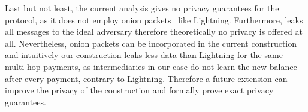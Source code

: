   Last but not least, the current analysis gives no privacy guarantees for the
  protocol, as it does not employ onion packets~\cite{sphinx} like Lightning.
  Furthermore, \fchan leaks all messages to the ideal adversary therefore
  theoretically no privacy is offered at all. Nevertheless, onion packets can be
  incorporated in the current construction and intuitively our construction
  leaks less data than Lightning for the same multi-hop payments, as
  intermediaries in our case do not learn the new balance after every payment,
  contrary to Lightning. Therefore a future extension can improve the privacy of
  the construction and formally prove exact privacy guarantees.
